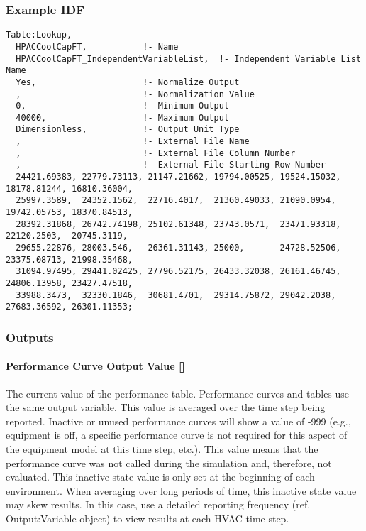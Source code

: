 \subsubsection{Example IDF}\label{example-idf}

\begin{lstlisting}
Table:Lookup,
  HPACCoolCapFT,           !- Name
  HPACCoolCapFT_IndependentVariableList,  !- Independent Variable List Name
  Yes,                     !- Normalize Output
  ,                        !- Normalization Value
  0,                       !- Minimum Output
  40000,                   !- Maximum Output
  Dimensionless,           !- Output Unit Type
  ,                        !- External File Name
  ,                        !- External File Column Number
  ,                        !- External File Starting Row Number
  24421.69383, 22779.73113, 21147.21662, 19794.00525, 19524.15032, 18178.81244, 16810.36004,
  25997.3589,  24352.1562,  22716.4017,  21360.49033, 21090.0954,  19742.05753, 18370.84513,
  28392.31868, 26742.74198, 25102.61348, 23743.0571,  23471.93318, 22120.2503,  20745.3119,
  29655.22876, 28003.546,   26361.31143, 25000,       24728.52506, 23375.08713, 21998.35468,
  31094.97495, 29441.02425, 27796.52175, 26433.32038, 26161.46745, 24806.13958, 23427.47518,
  33988.3473,  32330.1846,  30681.4701,  29314.75872, 29042.2038,  27683.36592, 26301.11353;
\end{lstlisting}

\subsubsection{Outputs}\label{outputs}

\paragraph{Performance Curve Output Value
{[}{]}}\label{performance-curve-output-value}

The current value of the performance table. Performance curves and
tables use the same output variable. This value is averaged over the
time step being reported. Inactive or unused performance curves will
show a value of -999 (e.g., equipment is off, a specific performance
curve is not required for this aspect of the equipment model at this
time step, etc.). This value means that the performance curve was not
called during the simulation and, therefore, not evaluated. This
inactive state value is only set at the beginning of each environment.
When averaging over long periods of time, this inactive state value may
skew results. In this case, use a detailed reporting frequency (ref.
Output:Variable object) to view results at each HVAC time step.


